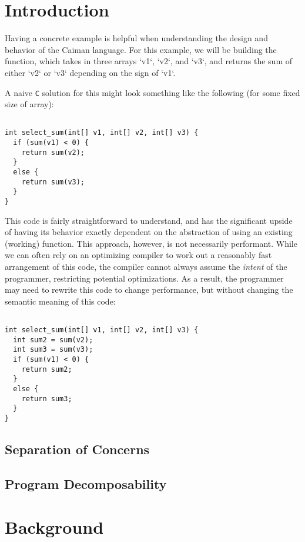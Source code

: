 \section{Introduction}
\label{sec:intro}

Having a concrete example is helpful when understanding the design and behavior of the Caiman language.
For this example, we will be building the  function, which takes in three arrays `v1`, `v2`, and `v3`, and returns the sum of either `v2` or `v3` depending on the sign of `v1`.

A naive \texttt{C} solution for this might look something like the following (for some fixed size of array):
%
\begin{lstlisting}

int select_sum(int[] v1, int[] v2, int[] v3) {
  if (sum(v1) < 0) {
    return sum(v2);
  } 
  else {
    return sum(v3);
  }
}
\end{lstlisting}
%
This code is fairly straightforward to understand, and has the significant upside of having its behavior exactly dependent on the abstraction of using an existing (working) function.
This approach, however, is not necessarily performant.  
While we can often rely on an optimizing compiler to work out a reasonably fast arrangement of this code, the compiler cannot always assume the \textit{intent} of the programmer, restricting potential optimizations.
As a result, the programmer may need to rewrite this code to change performance, but without changing the semantic meaning of this code:
%
\begin{lstlisting}

int select_sum(int[] v1, int[] v2, int[] v3) {
  int sum2 = sum(v2);
  int sum3 = sum(v3);
  if (sum(v1) < 0) {
    return sum2;
  } 
  else {
    return sum3;
  }
}
\end{lstlisting}
%

\subsection{Separation of Concerns}
\label{subsec:separation}

\subsection{Program Decomposability}
\label{subsec:decomposability}

\section{Background}
\label{subsec:background}

